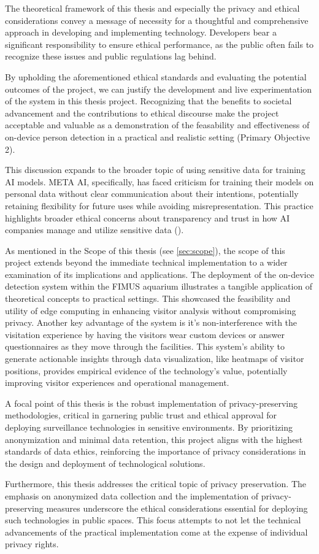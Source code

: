 The theoretical framework of this thesis and especially the privacy and ethical considerations convey a message of necessity for a thoughtful and comprehensive approach in developing and implementing technology. Developers bear a significant responsibility to ensure ethical performance, as the public often fails to recognize these issues and public regulations lag behind.

By upholding the aforementioned ethical standards and evaluating the potential outcomes of the project, we can justify the development and live experimentation of the system in this thesis project. Recognizing that the benefits to societal advancement and the contributions to ethical discourse make the project acceptable and valuable as a demonstration of the feasability and effectiveness of on-device person detection in a practical and realistic setting (Primary Objective 2). 

This discussion expands to the broader topic of using sensitive data for training AI models. META AI, specifically, has faced criticism for training their models on personal data without clear communication about their intentions, potentially retaining flexibility for future uses while avoiding misrepresentation. This practice highlights broader ethical concerns about transparency and trust in how AI companies manage and utilize sensitive data (\cite{ing2024metapersonvern}).

As mentioned in the Scope of this thesis (see \ref{sec:scope}), the scope of this project extends beyond the immediate technical implementation to a wider examination of its implications and applications. The deployment of the on-device detection system within the FIMUS aquarium illustrates a tangible application of theoretical concepts to practical settings. This showcased the feasibility and utility of edge computing in enhancing visitor analysis without compromising privacy. Another key advantage of the system is it's non-interference with the visitation experience by having the visitors wear custom devices or answer questionnaires as they move through the facilities. This system's ability to generate actionable insights through data visualization, like heatmaps of visitor positions, provides empirical evidence of the technology's value, potentially improving visitor experiences and operational management.

A focal point of this thesis is the robust implementation of privacy-preserving methodologies, critical in garnering public trust and ethical approval for deploying surveillance technologies in sensitive environments. By prioritizing anonymization and minimal data retention, this project aligns with the highest standards of data ethics, reinforcing the importance of privacy considerations in the design and deployment of technological solutions.

Furthermore, this thesis addresses the critical topic of privacy preservation. The emphasis on anonymized data collection and the implementation of privacy-preserving measures underscore the ethical considerations essential for deploying such technologies in public spaces. This focus attempts to not let the technical advancements of the practical implementation come at the expense of individual privacy rights.